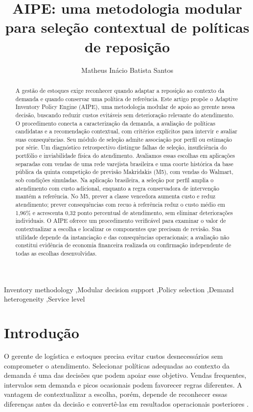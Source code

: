 \documentclass[preprint,12pt]{elsarticle}
\begin{document}
\begin{frontmatter}
\title{AIPE: uma metodologia modular para seleção contextual de políticas de reposição}
\author[ufal]{Matheus Inácio Batista Santos}
\begin{abstract}
A gestão de estoques exige reconhecer quando adaptar a reposição ao contexto da demanda e quando conservar uma política de referência. Este artigo propõe o Adaptive Inventory Policy Engine (AIPE), uma metodologia modular de apoio ao gerente nessa decisão, buscando reduzir custos evitáveis sem deterioração relevante do atendimento. O procedimento conecta a caracterização da demanda, a avaliação de políticas candidatas e a recomendação contextual, com critérios explícitos para intervir e avaliar suas consequências. Seu módulo de seleção admite associação por perfil ou estimação por série. Um diagnóstico retrospectivo distingue falhas de seleção, insuficiência do portfólio e inviabilidade física do atendimento. Avaliamos essas escolhas em aplicações separadas com vendas de uma rede varejista brasileira e uma coorte histórica da base pública da quinta competição de previsão Makridakis (M5), com vendas do Walmart, sob condições simuladas. Na aplicação brasileira, a seleção por perfil amplia o atendimento com custo adicional, enquanto a regra conservadora de intervenção mantém a referência. No M5, prever a classe vencedora aumenta custo e reduz atendimento; prever consequências com recuo à referência reduz o custo médio em 1,96\% e acrescenta 0,32 ponto percentual de atendimento, sem eliminar deteriorações individuais. O AIPE oferece um procedimento verificável para examinar o valor de contextualizar a escolha e localizar os componentes que precisam de revisão. Sua utilidade depende da instanciação e das consequências operacionais; a avaliação não constitui evidência de economia financeira realizada ou confirmação independente de todas as escolhas desenvolvidas.
\end{abstract}
\begin{keyword}
Inventory methodology \sep Modular decision support \sep Policy selection \sep Demand heterogeneity \sep Service level
\end{keyword}
\end{frontmatter}

\section{Introdução}
O gerente de logística e estoques precisa evitar custos desnecessários sem comprometer o atendimento. Selecionar políticas adequadas ao contexto da demanda é uma das decisões que podem apoiar esse objetivo. Vendas frequentes, intervalos sem demanda e picos ocasionais podem favorecer regras diferentes. A vantagem de contextualizar a escolha, porém, depende de reconhecer essas diferenças antes da decisão e convertê-las em resultados operacionais posteriores \cite{Axsater2006InventoryControl}.
\end{document}

